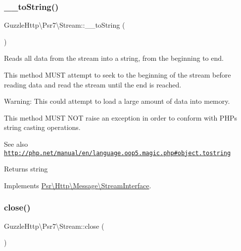 \subsubsection{\texorpdfstring{\+\_\+\+\_\+to\+String()}{\_\_toString()}}
{\footnotesize\ttfamily Guzzle\+Http\textbackslash{}\+Psr7\textbackslash{}\+Stream\+::\+\_\+\+\_\+to\+String (\begin{DoxyParamCaption}{ }\end{DoxyParamCaption})}

Reads all data from the stream into a string, from the beginning to end.

This method M\+U\+ST attempt to seek to the beginning of the stream before reading data and read the stream until the end is reached.

Warning\+: This could attempt to load a large amount of data into memory.

This method M\+U\+ST N\+OT raise an exception in order to conform with P\+HP\textquotesingle{}s string casting operations.

\begin{DoxySeeAlso}{See also}
\href{http://php.net/manual/en/language.oop5.magic.php#object.tostring}{\tt http\+://php.\+net/manual/en/language.\+oop5.\+magic.\+php\#object.\+tostring} 
\end{DoxySeeAlso}
\begin{DoxyReturn}{Returns}
string 
\end{DoxyReturn}


Implements \hyperlink{interfacePsr_1_1Http_1_1Message_1_1StreamInterface_a72df4e8851ae1a81087f3415fd6d73cd}{Psr\textbackslash{}\+Http\textbackslash{}\+Message\textbackslash{}\+Stream\+Interface}.

\mbox{\label{classGuzzleHttp_1_1Psr7_1_1Stream_a68ef1ae70e99df7f8553083e66e900d9}} 
\subsubsection{\texorpdfstring{close()}{close()}}
{\footnotesize\ttfamily Guzzle\+Http\textbackslash{}\+Psr7\textbackslash{}\+Stream\+::close (\begin{DoxyParamCaption}{ }\end{DoxyParamCaption})}

